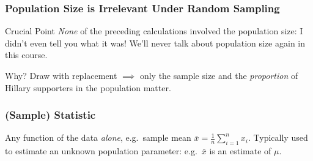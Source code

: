 \documentclass[handout]{beamer}
\begin{document}
\begin{frame}
  \frametitle{Population Size is Irrelevant Under Random Sampling}

  \begin{block}{Crucial Point}
    \emph{None} of the preceding calculations involved the population size: I didn't even tell you what it was!
    We'll never talk about population size again in this course.
  \end{block}

  \begin{block}{Why?}
    Draw with replacement $\implies$ only the sample size and the \emph{proportion} of Hillary supporters in the population matter.
  \end{block}

\end{frame}
\begin{frame}
  \frametitle{(Sample) Statistic}

  Any function of the data \emph{alone}, e.g.\ sample mean $\bar{x} = \frac{1}{n}\sum_{i=1}^n x_i$. Typically used to estimate an unknown population parameter: e.g.\ $\bar{x}$ is an estimate of $\mu$.

\end{frame}
\end{document}
